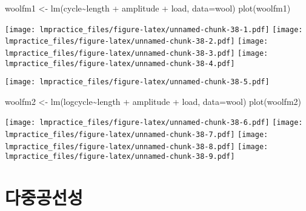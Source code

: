 \documentclass[
]{book}
\newenvironment{Shaded}{\begin{snugshade}}{\end{snugshade}}
\newcommand{\AttributeTok}[1]{\textcolor[rgb]{0.77,0.63,0.00}{#1}}
\newcommand{\FunctionTok}[1]{\textcolor[rgb]{0.00,0.00,0.00}{#1}}
\newcommand{\NormalTok}[1]{#1}
\newcommand{\OtherTok}[1]{\textcolor[rgb]{0.56,0.35,0.01}{#1}}
\newcommand{\SpecialCharTok}[1]{\textcolor[rgb]{0.00,0.00,0.00}{#1}}
\begin{document}
\begin{Shaded}
\begin{Highlighting}[]
\NormalTok{woolfm1 }\OtherTok{\textless{}{-}} \FunctionTok{lm}\NormalTok{(cycle}\SpecialCharTok{\textasciitilde{}}\NormalTok{length }\SpecialCharTok{+}\NormalTok{ amplitude }\SpecialCharTok{+}\NormalTok{ load, }\AttributeTok{data=}\NormalTok{wool)}
\FunctionTok{plot}\NormalTok{(woolfm1)}
\end{Highlighting}
\end{Shaded}

\texttt{[image: lmpractice\_files/figure-latex/unnamed-chunk-38-1.pdf]} \texttt{[image: lmpractice\_files/figure-latex/unnamed-chunk-38-2.pdf]} \texttt{[image: lmpractice\_files/figure-latex/unnamed-chunk-38-3.pdf]} \texttt{[image: lmpractice\_files/figure-latex/unnamed-chunk-38-4.pdf]}

\begin{Shaded}
\end{Shaded}

\texttt{[image: lmpractice\_files/figure-latex/unnamed-chunk-38-5.pdf]}

\begin{Shaded}
\begin{Highlighting}[]
\NormalTok{woolfm2 }\OtherTok{\textless{}{-}} \FunctionTok{lm}\NormalTok{(logcycle}\SpecialCharTok{\textasciitilde{}}\NormalTok{length }\SpecialCharTok{+}\NormalTok{ amplitude }\SpecialCharTok{+}\NormalTok{ load, }\AttributeTok{data=}\NormalTok{wool)}
\FunctionTok{plot}\NormalTok{(woolfm2)}
\end{Highlighting}
\end{Shaded}

\texttt{[image: lmpractice\_files/figure-latex/unnamed-chunk-38-6.pdf]} \texttt{[image: lmpractice\_files/figure-latex/unnamed-chunk-38-7.pdf]} \texttt{[image: lmpractice\_files/figure-latex/unnamed-chunk-38-8.pdf]} \texttt{[image: lmpractice\_files/figure-latex/unnamed-chunk-38-9.pdf]}

\hypertarget{uxb2e4uxc911uxacf5uxc120uxc131}{%
\section{다중공선성}\label{uxb2e4uxc911uxacf5uxc120uxc131}}
\end{document}
